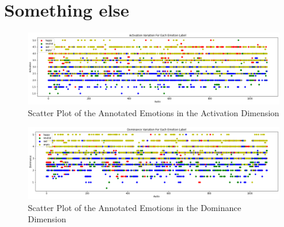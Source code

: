\section{Something else}

\begin{figure}[H]
	\centering
	\includegraphics[width=1\linewidth]{figs/appendix/IEMOCAP_data_study/activationScatterAllEmotions.png}
	\caption{Scatter Plot of the Annotated Emotions in the Activation Dimension}
	\label{fig:activationScatter}
\end{figure}

\begin{figure}[H]
	\centering
	\includegraphics[width=1\linewidth]{figs/appendix/IEMOCAP_data_study/dominanceScatterAllEmotions.png}
	\caption{Scatter Plot of the Annotated Emotions in the Dominance Dimension}
	\label{fig:dominanceScatter}
\end{figure}


